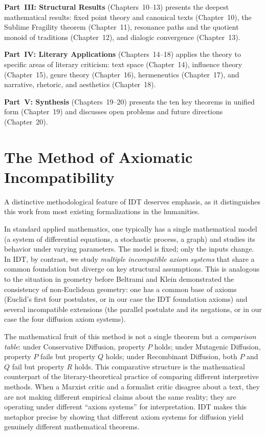 \documentclass[11pt,openany]{book}
\theoremstyle{definition}
\theoremstyle{plain}
\theoremstyle{remark}
\begin{document}
\textbf{Part~III: Structural Results} (Chapters~10--13) presents the deepest mathematical results: fixed point theory and canonical texts (Chapter~10), the Sublime Fragility theorem (Chapter~11), resonance paths and the quotient monoid of traditions (Chapter~12), and dialogic convergence (Chapter~13).

\textbf{Part~IV: Literary Applications} (Chapters~14--18) applies the theory to specific areas of literary criticism: text space (Chapter~14), influence theory (Chapter~15), genre theory (Chapter~16), hermeneutics (Chapter~17), and narrative, rhetoric, and aesthetics (Chapter~18).

\textbf{Part~V: Synthesis} (Chapters~19--20) presents the ten key theorems in unified form (Chapter~19) and discusses open problems and future directions (Chapter~20).

\section{The Method of Axiomatic Incompatibility}

A distinctive methodological feature of IDT deserves emphasis, as it distinguishes this work from most existing formalizations in the humanities.

In standard applied mathematics, one typically has a single mathematical model (a system of differential equations, a stochastic process, a graph) and studies its behavior under varying parameters. The model is fixed; only the inputs change. In IDT, by contrast, we study \emph{multiple incompatible axiom systems} that share a common foundation but diverge on key structural assumptions. This is analogous to the situation in geometry before Beltrami and Klein demonstrated the consistency of non-Euclidean geometry: one has a common base of axioms (Euclid's first four postulates, or in our case the IDT foundation axioms) and several incompatible extensions (the parallel postulate and its negations, or in our case the four diffusion axiom systems).

The mathematical fruit of this method is not a single theorem but a \emph{comparison table}: under Conservative Diffusion, property $P$ holds; under Mutagenic Diffusion, property $P$ fails but property $Q$ holds; under Recombinant Diffusion, both $P$ and $Q$ fail but property $R$ holds. This comparative structure is the mathematical counterpart of the literary-theoretical practice of comparing different interpretive methods. When a Marxist critic and a formalist critic disagree about a text, they are not making different empirical claims about the same reality; they are operating under different ``axiom systems'' for interpretation. IDT makes this metaphor precise by showing that different axiom systems for diffusion yield genuinely different mathematical theorems.
\end{document}
